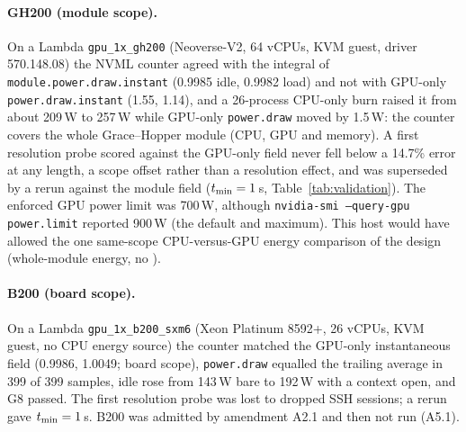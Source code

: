 \documentclass[sigconf]{acmart}
\begin{document}
\paragraph{GH200 (module scope).} On a Lambda \texttt{gpu\_1x\_gh200} (Neoverse-V2, 64 vCPUs, KVM
guest, driver 570.148.08) the NVML counter agreed with the integral of
\texttt{module.power.draw.instant} (0.9985 idle, 0.9982 load) and not with GPU-only
\texttt{power.draw.instant} (1.55, 1.14), and a 26-process CPU-only burn raised it from about
209\,W to 257\,W while GPU-only \texttt{power.draw} moved by 1.5\,W: the counter covers the whole
Grace--Hopper module (CPU, GPU and memory). A first resolution probe scored against the GPU-only
field never fell below a 14.7\% error at any length, a scope offset rather than a resolution
effect, and was superseded by a rerun against the module field ($t_{\min} = 1$\,s,
Table~\ref{tab:validation}). The enforced GPU power limit was 700\,W, although \texttt{nvidia-smi
--query-gpu power.limit} reported 900\,W (the default and maximum). This host would have allowed
the one same-scope CPU-versus-GPU energy comparison of the design (whole-module energy, no \NOne).

\paragraph{B200 (board scope).} On a Lambda \texttt{gpu\_1x\_b200\_sxm6} (Xeon Platinum 8592+, 26
vCPUs, KVM guest, no CPU energy source) the counter matched the GPU-only instantaneous field
(0.9986, 1.0049; board scope), \texttt{power.draw} equalled the trailing average in 399 of 399
samples, idle rose from 143\,W bare to 192\,W with a context open, and G8 passed. The first
resolution probe was lost to dropped SSH sessions; a rerun gave $t_{\min} = 1$\,s. B200 was admitted
by amendment A2.1 and then not run (A5.1).
\end{document}
